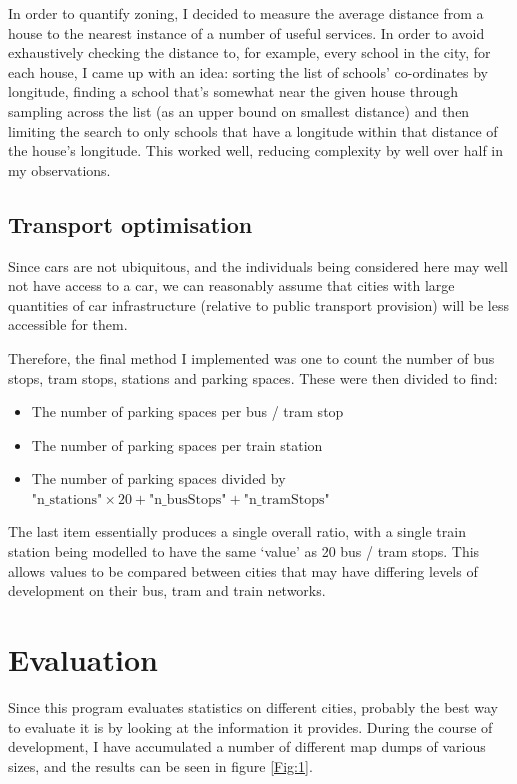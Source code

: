 \documentclass[12pt]{article} %
\begin{document}
In order to quantify zoning, I decided to measure the average distance from a house to the nearest instance of a number of useful services. In order to avoid exhaustively checking the distance to, for example, every school in the city, for each house, I came up with an idea: sorting the list of schools' co-ordinates by longitude, finding a school that's somewhat near the given house through sampling across the list (as an upper bound on smallest distance) and then limiting the search to only schools that have a longitude within that distance of the house's longitude. This worked well, reducing complexity by well over half in my observations.

\subsection{Transport optimisation}
Since cars are not ubiquitous, and the individuals being considered here may well not have access to a car, we can reasonably assume that cities with large quantities of car infrastructure (relative to public transport provision) will be less accessible for them.

Therefore, the final method I implemented was one to count the number of bus stops, tram stops, stations and parking spaces. These were then divided to find:

\begin{itemize}
	\item The number of parking spaces per bus / tram stop
	\item The number of parking spaces per train station
	\item The number of parking spaces divided by $\text{"n\_stations"}\times 20 + \text{"n\_busStops"} + \text{"n\_tramStops"}$
\end{itemize}

The last item essentially produces a single overall ratio, with a single train station being modelled to have the same `value' as 20 bus / tram stops. This allows values to be compared between cities that may have differing levels of development on their bus, tram and train networks.


\section{Evaluation}
Since this program evaluates statistics on different cities, probably the best way to evaluate it is by looking at the information it provides. During the course of development, I have accumulated a number of different map dumps of various sizes, and the results can be seen in figure \ref{Fig:1}.
\end{document}
